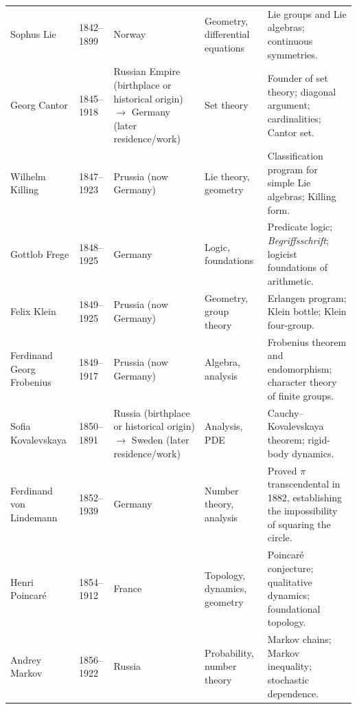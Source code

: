 {\begin{longtable}{@{}L{0.145\textwidth}L{0.09\textwidth}L{0.225\textwidth}L{0.14\textwidth}L{0.30\textwidth}@{}}
        Sophus Lie
        & 1842--1899
        & Norway
        & Geometry, differential equations
        & Lie groups and Lie algebras; continuous symmetries. \\

        Georg Cantor
        & 1845--1918
        & Russian Empire (birthplace or historical origin) \(\to\) Germany (later residence/work)
        & Set theory
        & Founder of set theory; diagonal argument; cardinalities; Cantor set. \\

        Wilhelm Killing
        & 1847--1923
        & Prussia (now Germany)
        & Lie theory, geometry
        & Classification program for simple Lie algebras; Killing form. \\

        Gottlob Frege
        & 1848--1925
        & Germany
        & Logic, foundations
        & Predicate logic; \textit{Begriffsschrift}; logicist foundations of
          arithmetic. \\

        Felix Klein
        & 1849--1925
        & Prussia (now Germany)
        & Geometry, group theory
        & Erlangen program; Klein bottle; Klein four-group. \\

        Ferdinand Georg Frobenius
        & 1849--1917
        & Prussia (now Germany)
        & Algebra, analysis
        & Frobenius theorem and endomorphism; character theory of finite groups. \\

        Sofia Kovalevskaya
        & 1850--1891
        & Russia (birthplace or historical origin) \(\to\) Sweden (later residence/work)
        & Analysis, PDE
        & Cauchy--Kovalevskaya theorem; rigid-body dynamics. \\

        Ferdinand von Lindemann
        & 1852--1939
        & Germany
        & Number theory, analysis
        & Proved $\pi$ transcendental in 1882, establishing the impossibility
          of squaring the circle. \\

        Henri Poincaré
        & 1854--1912
        & France
        & Topology, dynamics, geometry
        & Poincaré conjecture; qualitative dynamics; foundational topology. \\

        Andrey Markov
        & 1856--1922
        & Russia
        & Probability, number theory
        & Markov chains; Markov inequality; stochastic dependence. \\


\end{longtable}}
